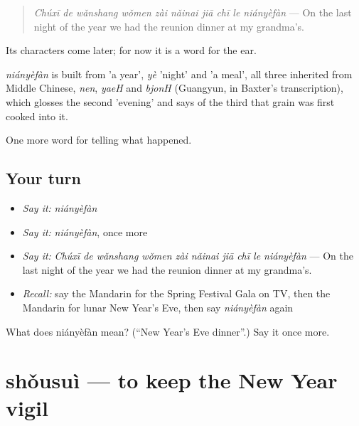 \begin{quote}
\emph{Chúxī de wǎnshang wǒmen zài nǎinai jiā chī le niányèfàn} — On the last night of the year we had the reunion dinner at my grandma's.
\end{quote}

Its characters come later; for now it is a word for the ear.

\begin{cousinweb}
\emph{niányèfàn} is built from  'a year', \emph{yè} 'night' and  'a meal', all three inherited from Middle Chinese, \emph{nen}, \emph{yaeH} and \emph{bjonH} (Guangyun, in Baxter's transcription), which glosses the second 'evening' and says of the third that grain was first cooked into it.
\end{cousinweb}

\begin{grammarlens}[title={What you've built}]
One more word for telling what happened.
\end{grammarlens}

\subsection*{Your turn}
\begin{itemize}
\raggedright
  \item \emph{Say it:} \emph{niányèfàn}
  \item \emph{Say it:} \emph{niányèfàn}, once more
  \item \emph{Say it:} \emph{Chúxī de wǎnshang wǒmen zài nǎinai jiā chī le niányèfàn} — On the last night of the year we had the reunion dinner at my grandma's.
  \item \emph{Recall:} say the Mandarin for the Spring Festival Gala on TV, then the Mandarin for lunar New Year's Eve, then say \emph{niányèfàn} again
\end{itemize}

\begin{tcolorbox}[breakable,colback=teal!4,colframe=teal!35!black,title={Before you move on}]
What does niányèfàn mean? (\textquotedblleft{}New Year's Eve dinner\textquotedblright{}.) Say it once more.
\end{tcolorbox}
\section[shǒusuì]{shǒusuì — to keep the New Year vigil}

\label{lesson:ZH-C333-shousui}



